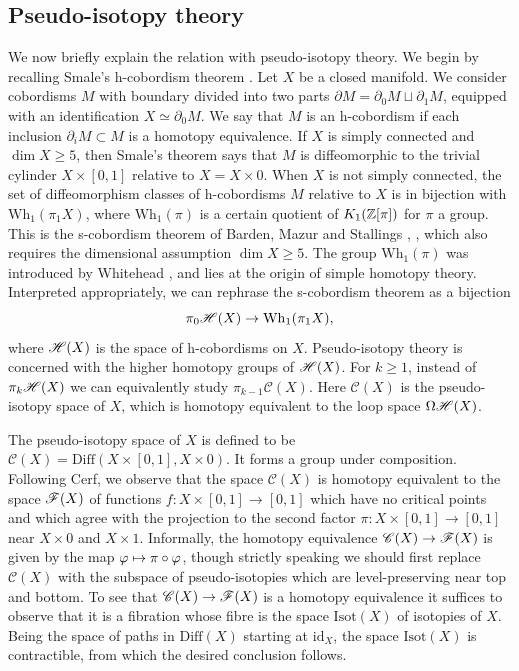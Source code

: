 \documentclass[11pt]{article}
\numberwithin{equation}{section}\providecommand{\dpl}{\displaystyle}
\let\mathcal\mathscr
\newcommand\mto{\mathchoice{\longmapsto}{\mapsto}{\mapsto}{\mapsto}}
\newcommand{\Diff}{\mathrm{Diff}}
\newcommand{\id}{\mathrm{id}}
\newcommand{\Isot}{\mathrm{Isot}}
\newcommand{\Wh}{\mathrm{Wh}}
\theoremstyle{plain}
\theoremstyle{definition}
\newcommand{\cC}{\mathcal{C}}\newcommand{\cD}{\mathcal{D}}
\begin{document}
\subsection{Pseudo-isotopy theory}

We now briefly explain the relation with pseudo-isotopy theory. We begin by recalling Smale's h-cobordism theorem \cite{S61}. Let $X$ be a closed manifold. We consider cobordisms $M$ with boundary divided into two parts $\partial M = \partial_0M \sqcup \partial_1M$, equipped with an identification $X \simeq \partial_0 M$. We say that $M$ is an h-cobordism if each inclusion $\partial_i M \subset M$ is a homotopy equivalence. If $X$ is simply connected and $\dim X \geq 5$, then Smale's theorem says that $M$ is diffeomorphic to the trivial cylinder $X \times [0,1]$ relative to $X=X \times 0 $. When $X$ is not simply connected, the set of diffeomorphism classes of h-cobordisms $M$ relative to $X$ is in bijection with $\Wh_1( \pi_1 X)$, where $\Wh_1(\pi)$ is a certain quotient of $K_1(\mathbb{Z}[\pi])$ for $\pi$ a group. This is the s-cobordism theorem of Barden, Mazur and Stallings \cite{B64}, \cite{M63}, which also requires the dimensional assumption $\dim X \geq 5$. The group $\Wh_1(\pi)$ was introduced by Whitehead \cite{W50}, and lies at the origin of simple homotopy theory. Interpreted appropriately, we can rephrase the s-cobordism theorem as a bijection\vspace*{-3pt}
\[ \pi_0 \cH(X) \to \Wh_1( \pi_1 X), \]
where $\cH(X)$ is the space of h-cobordisms on $X$. Pseudo-isotopy theory is concerned with the higher homotopy groups of $\cH(X)$. For $k \geq 1$, instead of $\pi_k\cH(X)$ we can equivalently study $\pi_{k-1}\cC(X)$. Here $\cC(X)$ is the pseudo-isotopy space of $X$, which is homotopy equivalent to the loop space $\Omega \cH(X)$.

The pseudo-isotopy space of $X$ is defined to be $\cC(X)=\Diff(X \times [0,1], X \times 0)$. It forms a group under composition. Following Cerf, we observe that the space $\cC(X)$ is homotopy equivalent to the space $\cF(X)$ of functions $f: X \times [0,1] \to [0,1]$ which have no critical points and which agree with the projection to the second factor $\pi:X \times [0,1] \to [0,1]$ near $X \times 0$ and $X \times 1$. Informally, the homotopy equivalence $\cC(X) \to \cF(X)$ is given by the map $\varphi \mto \pi \circ \varphi$, though strictly speaking we should first replace $\cC(X)$ with the subspace of pseudo-isotopies which are level-preserving near top and bottom. To see that $\cC(X) \to \cF(X)$ is a homotopy equivalence it suffices to observe that it is a fibration whose fibre is the space $\Isot(X)$ of isotopies of $X$. Being the space of paths in $\Diff(X)$ starting at $\id_X$, the space $\Isot(X)$ is contractible, from which the desired conclusion follows.
\end{document}
